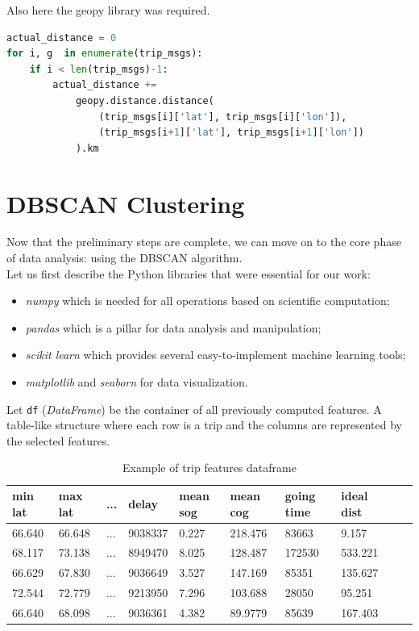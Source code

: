     Also here the geopy \cite{geopy} library was required.
        
    \begin{lstlisting}[language=Python]
actual_distance = 0
for i, g  in enumerate(trip_msgs):
    if i < len(trip_msgs)-1:
        actual_distance += 
            geopy.distance.distance(
                (trip_msgs[i]['lat'], trip_msgs[i]['lon']),
                (trip_msgs[i+1]['lat'], trip_msgs[i+1]['lon'])
            ).km
    \end{lstlisting}

\clearpage
\section{DBSCAN Clustering}

Now that the preliminary steps are complete, we can move on to the core phase of data analysis: \clustering using the DBSCAN algorithm.
\\
Let us first describe the Python libraries that were essential for our work:
\begin{itemize}
\item \textit{numpy} \cite{numpy} which is needed for all operations based on scientific computation;
\item \textit{pandas} \cite{pandas} which is a pillar for data analysis and manipulation;
\item \textit{scikit learn} \cite{sklearn} which provides several easy-to-implement machine learning tools;
\item \textit{matplotlib} \cite{matplotlib} and \textit{seaborn} \cite{seaborn} for data visualization.
\end{itemize}

Let \verb|df| (\textit{DataFrame}) be the container of all previously computed features. A table-like structure where each row is a trip and the columns are represented by the selected features.

\begin{table}[H]
\centering
\begin{tabular}{|l|l|l|l|l|l|l|l|l|l|}
\hline
\textbf{min lat}  & \textbf{max lat}  & \textbf{...}  & \textbf{delay}     & \textbf{mean sog} & \textbf{mean cog}  & \textbf{going time} & \textbf{ideal dist}  \\
\hline
66.640 & 66.648 & ... & 9038337 & 0.227  & 218.476 & 83663 & 9.157         \\
68.117 & 73.138 & ... & 8949470 & 8.025  & 128.487 & 172530 & 533.221       \\
66.629 & 67.830 & ... & 9036649 & 3.527  & 147.169 & 85351 & 135.627       \\
72.544 & 72.779 & ... & 9213950 & 7.296  & 103.688 & 28050 & 95.251        \\
66.640 & 68.098 & ... & 9036361 & 4.382  & 89.9779 & 85639 & 167.403      \\
\hline
\end{tabular}
\caption{Example of trip features dataframe}
\end{table}

